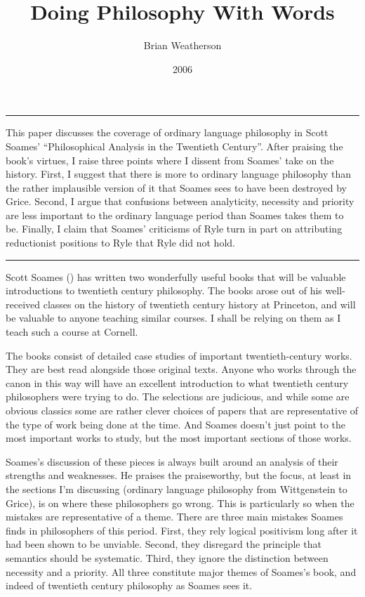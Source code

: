 \documentclass[
  10pt,
  letterpaper,
  DIV=11,
  numbers=noendperiod,
  twoside]{scrartcl}
\title{Doing Philosophy With Words}
\author{Brian Weatherson}
\date{2006}
\renewenvironment{abstract}
 {\vspace{-1.25cm}
 \quotation\small\noindent\rule{\linewidth}{.5pt}\par\smallskip
 \noindent }
 {\par\noindent\rule{\linewidth}{.5pt}\endquotation}
\begin{document}
\maketitle
\begin{abstract}
This paper discusses the coverage of ordinary language philosophy in
Scott Soames' ``Philosophical Analysis in the Twentieth Century''. After
praising the book's virtues, I raise three points where I dissent from
Soames' take on the history. First, I suggest that there is more to
ordinary language philosophy than the rather implausible version of it
that Soames sees to have been destroyed by Grice. Second, I argue that
confusions between analyticity, necessity and priority are less
important to the ordinary language period than Soames takes them to be.
Finally, I claim that Soames' criticisms of Ryle turn in part on
attributing reductionist positions to Ryle that Ryle did not hold.
\end{abstract}

Scott Soames () has written two
wonderfully useful books that will be valuable introductions to
twentieth century philosophy. The books arose out of his well-received
classes on the history of twentieth century history at Princeton, and
will be valuable to anyone teaching similar courses. I shall be relying
on them as I teach such a course at Cornell.

The books consist of detailed case studies of important
twentieth-century works. They are best read alongside those original
texts. Anyone who works through the canon in this way will have an
excellent introduction to what twentieth century philosophers were
trying to do. The selections are judicious, and while some are obvious
classics some are rather clever choices of papers that are
representative of the type of work being done at the time. And Soames
doesn't just point to the most important works to study, but the most
important sections of those works.

Soames's discussion of these pieces is always built around an analysis
of their strengths and weaknesses. He praises the praiseworthy, but the
focus, at least in the sections I'm discussing (ordinary language
philosophy from Wittgenstein to Grice), is on where these philosophers
go wrong. This is particularly so when the mistakes are representative
of a theme. There are three main mistakes Soames finds in philosophers
of this period. First, they rely logical positivism long after it had
been shown to be unviable. Second, they disregard the principle that
semantics should be systematic. Third, they ignore the distinction
between necessity and a priority. All three constitute major themes of
Soames's book, and indeed of twentieth century philosophy as Soames sees
it.
\end{document}
